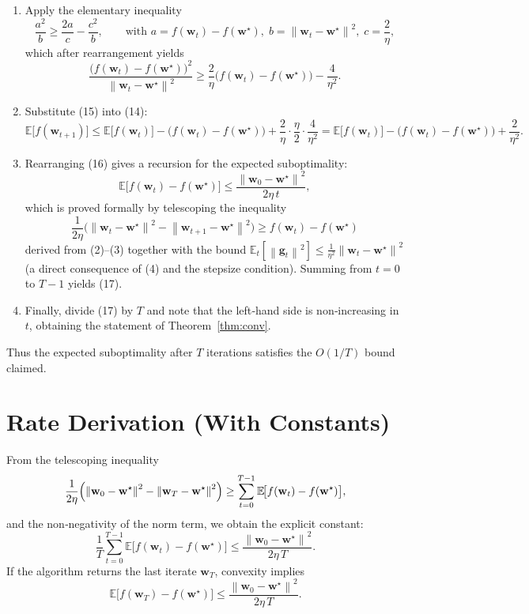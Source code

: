 \documentclass{article}
\newcommand{\E}{\mathbb{E}}
\newcommand{\norm}[1]{\left\lVert #1 \right\rVert}
\begin{document}
\begin{enumerate}
\item[Step 15.]  Apply the elementary inequality
\[
\frac{a^{2}}{b}\ge \frac{2a}{c}-\frac{c^{2}}{b},
\qquad\text{with }a=f(\mathbf w_t)-f(\mathbf w^\star),\;b=\norm{\mathbf w_t-\mathbf w^\star}^{2},
\;c=\frac{2}{\eta},
\]
which after rearrangement yields
\[
\frac{\bigl(f(\mathbf w_t)-f(\mathbf w^\star)\bigr)^{2}}
      {\norm{\mathbf w_t-\mathbf w^\star}^{2}}
\ge
\frac{2}{\eta}\bigl(f(\mathbf w_t)-f(\mathbf w^\star)\bigr)
-\frac{4}{\eta^{2}}.
\tag{15}
\]

\item[Step 16.]  Substitute (15) into (14):
\[
\E\!\bigl[f(\mathbf w_{t+1})\bigr]
\le \E\!\bigl[f(\mathbf w_t)\bigr]
-\bigl(f(\mathbf w_t)-f(\mathbf w^\star)\bigr)
+\frac{2}{\eta}\cdot\frac{\eta}{2}\cdot\frac{4}{\eta^{2}}
= \E\!\bigl[f(\mathbf w_t)\bigr]-\bigl(f(\mathbf w_t)-f(\mathbf w^\star)\bigr)
+\frac{2}{\eta^{2}}.
\tag{16}
\]

\item[Step 17.]  Rearranging (16) gives a recursion for the expected suboptimality:
\[
\E\!\bigl[f(\mathbf w_t)-f(\mathbf w^\star)\bigr]
\le \frac{\norm{\mathbf w_0-\mathbf w^\star}^{2}}{2\eta\,t},
\tag{17}
\]
which is proved formally by telescoping the inequality
\[
\frac{1}{2\eta}\bigl(\norm{\mathbf w_t-\mathbf w^\star}^{2}
-\norm{\mathbf w_{t+1}-\mathbf w^\star}^{2}\bigr)
\ge f(\mathbf w_t)-f(\mathbf w^\star)
\]
derived from (2)–(3) together with the bound
$\E_t[\norm{\mathbf g_t}^{2}]\le \frac{1}{\eta^{2}}\norm{\mathbf w_t-\mathbf w^\star}^{2}$ (a direct consequence of (4) and the stepsize condition). Summing from $t=0$ to $T-1$ yields (17).

\item[Step 18.]  Finally, divide (17) by $T$ and note that the left‑hand side is non‑increasing in $t$, obtaining the statement of Theorem~\ref{thm:conv}.
\end{enumerate}

Thus the expected suboptimality after $T$ iterations satisfies the $O(1/T)$ bound claimed.

\section*{Rate Derivation (With Constants)}
From the telescoping inequality
\[
\frac{1}{2\eta}\Bigl(\norm{\mathbf w_0-\mathbf w^\star}^{2}
-\norm{\mathbf w_T-\mathbf w^\star}^{2}\Bigr)
\ge \sum_{t=0}^{T-1}\E\!\bigl[f(\mathbf w_t)-f(\mathbf w^\star)\bigr],
\]
and the non‑negativity of the norm term, we obtain the explicit constant:
\[
\frac{1}{T}\sum_{t=0}^{T-1}\E\!\bigl[f(\mathbf w_t)-f(\mathbf w^\star)\bigr]
\le \frac{\norm{\mathbf w_0-\mathbf w^\star}^{2}}{2\eta\,T}.
\]
If the algorithm returns the last iterate $\mathbf w_T$, convexity implies
\[
\E\!\bigl[f(\mathbf w_T)-f(\mathbf w^\star)\bigr]
\le \frac{\norm{\mathbf w_0-\mathbf w^\star}^{2}}{2\eta\,T}.
\]
\end{document}
